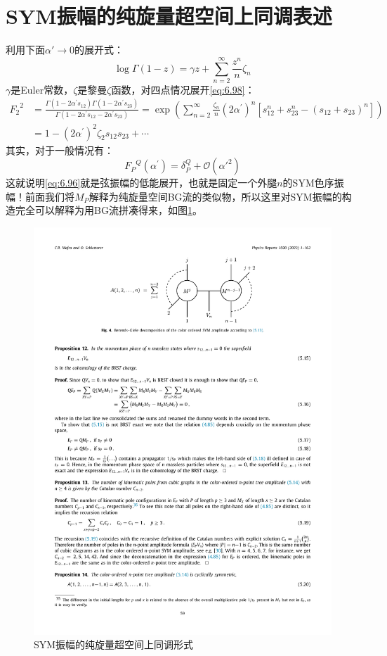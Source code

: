 \section{SYM振幅的纯旋量超空间上同调表述}
利用下面$\alpha'\to 0$的展开式：
\begin{equation}
	\log\Gamma(1-z)=\gamma z+\sum_{n=2}^\infty\frac{z^n}{n}\zeta_n
\end{equation}
$\gamma$是Euler常数，$\zeta$是黎曼$\zeta$函数，对四点情况展开\ref{eq:6.98}：
\begin{equation}
	\label{eq:6.101}
\begin{aligned}
		{F_2}^2&=\frac{\Gamma(1-2\alpha^{\prime}s_{12})\Gamma(1-2\alpha^{\prime}s_{23})}{\Gamma(1-2\alpha^{\prime}s_{12}-2\alpha^{\prime}s_{23})}=\exp\left(\sum_{n=2}^\infty\frac{\zeta_n}{n}(2\alpha^{\prime})^n\left[s_{12}^n+s_{23}^n-(s_{12}+s_{23})^n\right]\right)\\
	&=1-(2\alpha^{\prime})^2\zeta_2s_{12}s_{23}+\cdots
\end{aligned}
\end{equation}
其实，对于一般情况有：
\begin{equation}
	{F_P}^{Q}(\alpha^{\prime})=\delta_P^{Q}+\mathcal{O}({\alpha'}^2)
\end{equation}
这就说明\ref{eq:6.96}就是弦振幅的低能展开，也就是固定一个外腿$n$的SYM色序振幅！前面我们将$M_P$解释为纯旋量空间BG流的类似物，所以这里对SYM振幅的构造完全可以解释为用BG流拼凑得来，如图\ref{fig:6.9}。
\begin{figure}[htbp]
	\centering
	\includegraphics[width=0.8\linewidth]{figs/fig16.pdf}
	\caption{SYM振幅的纯旋量超空间上同调形式}
	\label{fig:6.9}
\end{figure}
